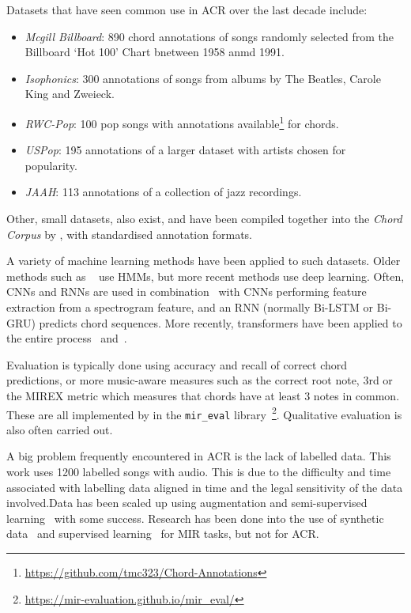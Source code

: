 Datasets that have seen common use in ACR over the last decade include:
\begin{itemize}
    \item \emph{Mcgill Billboard}: 890 chord annotations of songs randomly selected from the Billboard `Hot 100' Chart bnetween 1958 anmd 1991.~\citep{McgillBillboard}
    \item \emph{Isophonics}: 300 annotations of songs from albums by The Beatles, Carole King and Zweieck.~\citep{Isophonics}
    \item \emph{RWC-Pop}: 100 pop songs with annotations available\footnote{\url{https://github.com/tmc323/Chord-Annotations}} for chords.~\citep{RWC}
    \item \emph{USPop}: 195 annotations of a larger dataset with artists chosen for popularity.~\citep{USPop}
    \item \emph{JAAH}: 113 annotations of a collection of jazz recordings.~\cite{JAAH}
\end{itemize}

Other, small datasets, also exist, and have been compiled together into the \emph{Chord Corpus} by \citet{Choco}, with standardised annotation formats.

A variety of machine learning methods have been applied to such datasets. Older methods such as ~\cite{ACRHMM} use HMMs, but more recent methods use deep learning. Often, CNNs and RNNs are used in combination~\citep{ACRCNNRNN1,ACRLargeVocab1,StructuredTraining} with CNNs performing feature extraction from a spectrogram feature, and an RNN (normally Bi-LSTM or Bi-GRU) predicts chord sequences. More recently, transformers have been applied to the entire process~\citet{MelodyTranscriptionViaGenerativePreTraining} and~\citet{HarmonyTransformer,AttendToChords}.

Evaluation is typically done using accuracy and recall of correct chord predictions, or more music-aware measures such as the correct root note, 3rd or the MIREX metric which measures that chords have at least 3 notes in common. These are all implemented by \citet{MIREVAL} in the \texttt{mir\_eval} library~\footnote{\url{https://mir-evaluation.github.io/mir_eval/}}. Qualitative evaluation is also often carried out.

A big problem frequently encountered in ACR is the lack of labelled data. This work uses 1200 labelled songs with audio. This is due to the difficulty and time associated with labelling data aligned in time and the legal sensitivity of the data involved.Data has been scaled up using augmentation and semi-supervised learning~\citep{ScalingUpSemiSupervisedLearning} with some success. Research has been done into the use of synthetic data~\citep{MusicGenTrainingData,AnnotationFreeSyntheticData} and supervised learning~\citep{MERTSupervisedLearning} for MIR tasks, but not for ACR.

